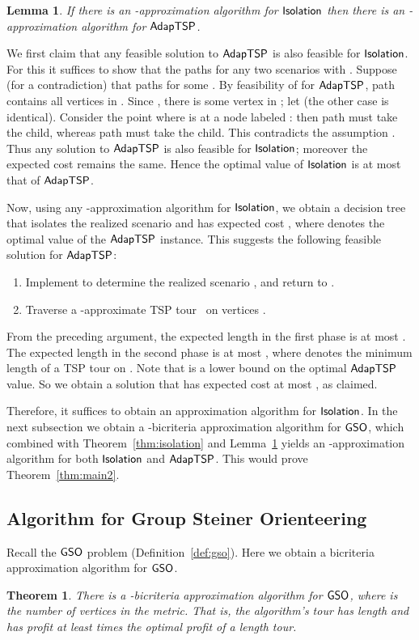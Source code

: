 \documentclass[11pt]{article}
\newtheorem{theorem}[thm]{Theorem}
\newtheorem{lemma}[thm]{Lemma}
\def\isoprob{\ensuremath{{\sf Isolation}}\xspace}
\def\stsp{\ensuremath{{\sf AdapTSP}}\xspace}
\def\gso{\ensuremath{{\sf GSO}}\xspace}
\newenvironment{pf}{

\noindent{\bf Proof:}} {\hfill


}
\begin{document}
\begin{lemma}
  \label{lem:reduce-to-isol}
If there is an -approximation algorithm for \isoprob then there is an
  -approximation algorithm for \stsp.
\end{lemma}
\begin{pf}
We first claim that any feasible solution  to \stsp is also feasible for \isoprob. For this it suffices to show that
the paths  for any two scenarios  with . Suppose (for a contradiction) that paths
 for some . By feasibility of  for \stsp, path  contains all vertices in
. Since , there is some vertex in ; let  (the other case is identical). Consider the point where  is at a node labeled : then path
 must take the  child, whereas path  must take the  child. This contradicts the assumption
. Thus any solution to \stsp is also feasible for \isoprob; moreover the expected cost remains the
same. Hence the optimal value of \isoprob is at most that of \stsp.


Now, using any -approximation algorithm for \isoprob, we obtain a decision tree  that isolates the realized scenario and
has expected cost ,  where  denotes the optimal value of the \stsp instance. This suggests the
following feasible solution for \stsp:
\begin{enumerate}
 \item Implement  to determine the realized scenario , and return to .
 \item Traverse a -approximate TSP tour~\cite{c} on vertices .
\end{enumerate}
From the preceding argument, the expected length in the first phase is at most . The expected length
in the second phase is at most , where  denotes the minimum length
of a TSP tour on . Note that  is a lower bound on the optimal \stsp
value. So we obtain a solution that has expected cost at most , as claimed.
\end{pf}

\medskip

Therefore, it suffices to obtain an approximation algorithm for \isoprob. In the next subsection we obtain a -bicriteria approximation  algorithm for \gso, which combined with Theorem~\ref{thm:isolation} and Lemma~\ref{lem:reduce-to-isol} yields an -approximation algorithm for both \isoprob and \stsp.  This would prove Theorem~\ref{thm:main2}.  

\subsection{Algorithm for Group Steiner Orienteering} \label{subsec:gso}
Recall the \gso problem (Definition~\ref{def:gso}). 
Here  we obtain a bicriteria approximation algorithm for \gso.
\begin{theorem}
  \label{thm:gso}
  There is a -bicriteria approximation algorithm for
  \gso, where  is the number of vertices in the metric. That is, the algorithm's tour has length  and has profit at least  times the optimal profit of a length  tour.
\end{theorem}
\end{document}

